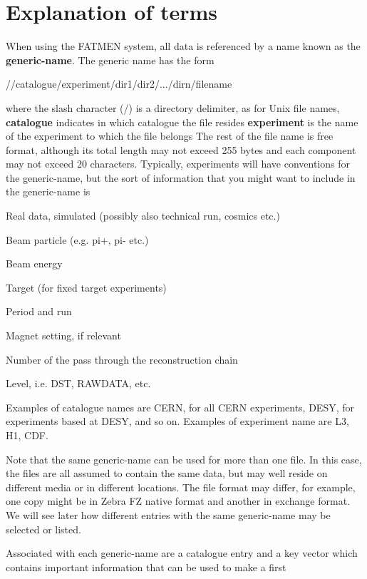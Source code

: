 \section{Explanation of terms}
\par
When using the FATMEN system, all data is referenced by a name known 
as the {\bf generic-name}. 
The generic name has the form
\begin{XMP}
//catalogue/experiment/dir1/dir2/.../dirn/filename
\end{XMP}
where
the slash character (/) is a directory delimiter, as for Unix file names,
{\bf catalogue} indicates in which catalogue the file resides
{\bf experiment} is the name of the experiment to which the file
belongs
The rest of the file name is free format, although its total length
may not exceed 255 bytes and each component may not exceed
20 characters. Typically, experiments will have conventions
for the generic-name, but the sort of information that you might
want to include in the generic-name is
\begin{UL}
\item
Real data, simulated (possibly also technical run, cosmics etc.)
\item 
Beam particle (e.g. pi+, pi- etc.)
\item
Beam energy
\item
Target (for fixed target experiments)
\item
Period and run
\item
Magnet setting, if relevant
\item
Number of the pass through the reconstruction chain
\item
Level, i.e. DST, RAWDATA, etc.
\end{UL}
\par
Examples of catalogue names are CERN, for all CERN experiments, DESY, for experiments
based at DESY, and so on. Examples of experiment name are L3, H1, CDF.
\par
Note that the same generic-name can be used for more than one file. 
In this case, the files are all assumed to contain the same data,
but may well reside on different media or in different locations.
The file format may differ, for example, one copy might be in
Zebra FZ native format and another in exchange format.
We will see later how different entries with the same generic-name
may be selected or listed.     
\par
Associated with each generic-name are a catalogue entry and a key vector
which contains important information that can be used to make a first
